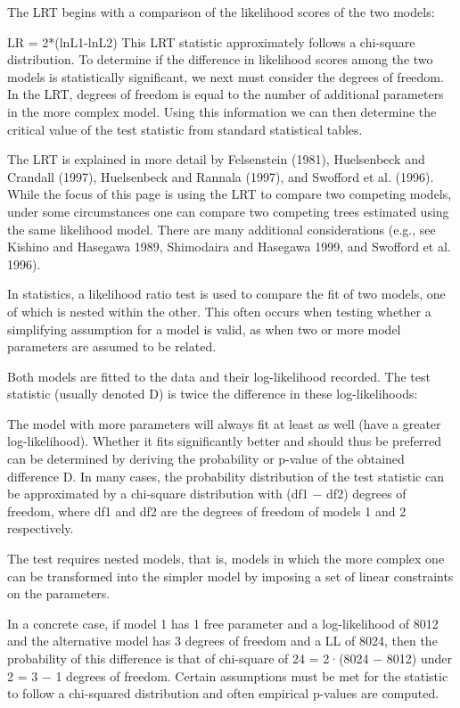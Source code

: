 \documentclass[12pt, a4paper]{report}
\theoremstyle{plain}
\theoremstyle{definition}
\theoremstyle{remark}
\begin{document}
The LRT begins with a comparison of the likelihood scores of the two models:

LR = 2*(lnL1-lnL2)
This LRT statistic approximately follows a chi-square distribution. To determine if the difference in likelihood scores among the two models is statistically significant, we next must consider the degrees of freedom. In the LRT, degrees of freedom is equal to the number of additional parameters in the more complex model. Using this information we can then determine the critical value of the test statistic from standard statistical tables.

The LRT is explained in more detail by Felsenstein (1981), Huelsenbeck and Crandall (1997), Huelsenbeck and Rannala (1997), and Swofford et al. (1996). While the focus of this page is using the LRT to compare two competing models, under some circumstances one can compare two competing trees estimated using the same likelihood model. There are many additional considerations (e.g., see Kishino and Hasegawa 1989, Shimodaira and Hasegawa 1999, and Swofford et al. 1996).


In statistics, a likelihood ratio test is used to compare the fit of two models, one of which is nested within the other. This often occurs when testing whether a simplifying assumption for a model is valid, as when two or more model parameters are assumed to be related.

Both models are fitted to the data and their log-likelihood recorded. The test statistic (usually denoted D) is twice the difference in these log-likelihoods:

The model with more parameters will always fit at least as well (have a greater log-likelihood). Whether it fits significantly better and should thus be preferred can be determined by deriving the probability or p-value of the obtained difference D. In many cases, the probability distribution of the test statistic can be approximated by a chi-square distribution with (df1 − df2) degrees of freedom, where df1 and df2 are the degrees of freedom of models 1 and 2 respectively.

The test requires nested models, that is, models in which the more complex one can be transformed into the simpler model by imposing a set of linear constraints on the parameters.

In a concrete case, if model 1 has 1 free parameter and a log-likelihood of 8012 and the alternative model has 3 degrees of freedom and a LL of 8024, then the probability of this difference is that of chi-square of 24 = 2·(8024 − 8012) under 2 = 3 − 1 degrees of freedom. Certain assumptions must be met for the statistic to follow a chi-squared distribution and often empirical p-values are computed.
	
\end{document}
